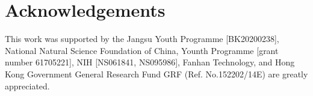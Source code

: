 \documentclass[a4paper,conference]{IEEEtran}
\theoremstyle{plain}%
\begin{document}
\section{Acknowledgements}

This work was supported by the Jangsu Youth Programme [BK20200238], National Natural Science Foundation of China, Younth Programme [grant number 61705221], NIH [NS061841, NS095986], Fanhan Technology, and Hong Kong Government General Research Fund GRF (Ref. No.152202/14E) are greatly appreciated.





\end{document}
